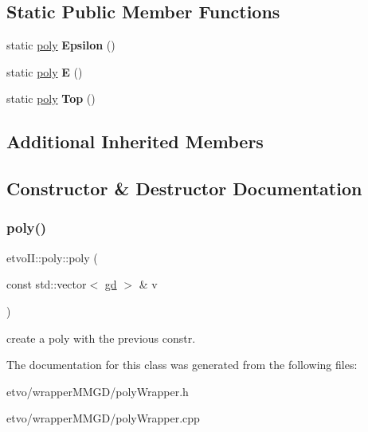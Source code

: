 \subsection*{Static Public Member Functions}
\begin{DoxyCompactItemize}
\item 
\mbox{\label{classetvo_i_i_1_1poly_a418ab66b51e7537f9d631b5635f94e9e}} 
static \mbox{\hyperlink{classetvo_i_i_1_1poly}{poly}} {\bfseries Epsilon} ()
\item 
\mbox{\label{classetvo_i_i_1_1poly_a5b100fc773873e32030033198fc8559a}} 
static \mbox{\hyperlink{classetvo_i_i_1_1poly}{poly}} {\bfseries E} ()
\item 
\mbox{\label{classetvo_i_i_1_1poly_a3c5589c416c9ac1651c2ad706d8dfd51}} 
static \mbox{\hyperlink{classetvo_i_i_1_1poly}{poly}} {\bfseries Top} ()
\end{DoxyCompactItemize}
\subsection*{Additional Inherited Members}


\subsection{Constructor \& Destructor Documentation}
\mbox{\label{classetvo_i_i_1_1poly_ae6a829a66995bc2fe54024c96dc23c24}} 
\subsubsection{\texorpdfstring{poly()}{poly()}}
{\footnotesize\ttfamily etvo\+I\+I\+::poly\+::poly (\begin{DoxyParamCaption}\item[{const std\+::vector$<$ \mbox{\hyperlink{classetvo_i_i_1_1gd}{gd}} $>$ \&}]{v }\end{DoxyParamCaption})}

create a poly with the previous constr. 

The documentation for this class was generated from the following files\+:\begin{DoxyCompactItemize}
\item 
etvo/wrapper\+M\+M\+G\+D/poly\+Wrapper.\+h\item 
etvo/wrapper\+M\+M\+G\+D/poly\+Wrapper.\+cpp\end{DoxyCompactItemize}
